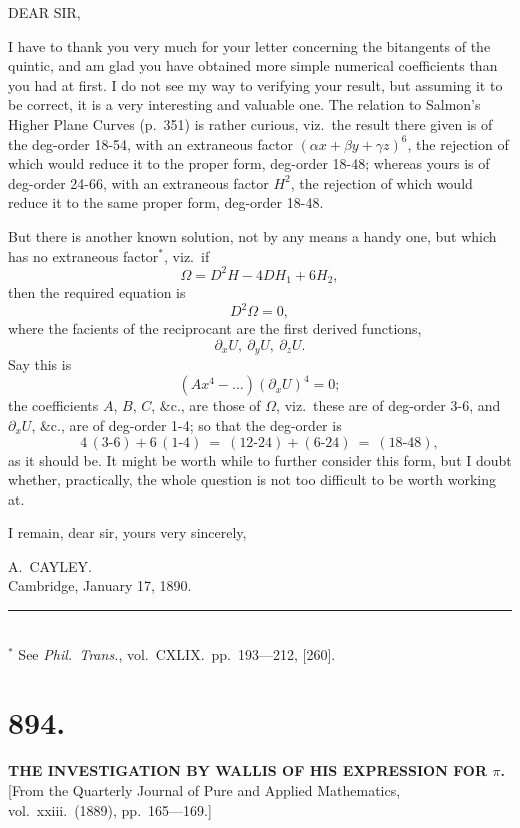 \documentclass[11pt,a4paper]{article}
\begin{document}
DEAR SIR,

I have to thank you very much for your letter concerning the bitangents of the quintic, and am glad you have obtained more simple numerical coefficients than you had at first. I do not see my way to verifying your result, but assuming it to be correct, it is a very interesting and valuable one. The relation to Salmon's Higher Plane Curves (p.\ 351) is rather curious, viz.\ the result there given is of the deg-order 18-54, with an extraneous factor $(\alpha x + \beta y + \gamma z)^6$, the rejection of which would reduce it to the proper form, deg-order 18-48; whereas yours is of deg-order 24-66, with an extraneous factor $H^2$, the rejection of which would reduce it to the same proper form, deg-order 18-48.

But there is another known solution, not by any means a handy one, but which has no extraneous factor$^*$, viz.\ if
\[
\Omega = D^2H - 4DH_1 + 6H_2,
\]
then the required equation is
\[
D^2\Omega = 0,
\]
where the facients of the reciprocant are the first derived functions,
\[
\partial_x U,\ \partial_y U,\ \partial_z U.
\]
Say this is
\[
(Ax^4 - \ldots)(\partial_x U)^4 = 0;
\]
the coefficients $A$, $B$, $C$, \&c., are those of $\Omega$, viz.\ these are of deg-order 3-6, and $\partial_x U$, \&c., are of deg-order 1-4; so that the deg-order is
\[
4\,(3\text{-}6) + 6\,(1\text{-}4)\ =\ (12\text{-}24) + (6\text{-}24)\ =\ (18\text{-}48),
\]
as it should be. It might be worth while to further consider this form, but I doubt whether, practically, the whole question is not too difficult to be worth working at.

I remain, dear sir, yours very sincerely,

\begin{flushright}
A.\ CAYLEY.\\
Cambridge, January 17, 1890.
\end{flushright}

\vspace{0.5em}
\noindent\rule{2in}{0.4pt}\\
$^*$ See \emph{Phil.\ Trans.}, vol.\ CXLIX.\ pp.\ 193---212, [260].


\section*{894.}
\begin{center}
{\large\bfseries THE INVESTIGATION BY WALLIS OF HIS EXPRESSION FOR $\pi$.}\\[0.5em]
\small [From the Quarterly Journal of Pure and Applied Mathematics, vol.\ xxiii.\ (1889), pp.\ 165---169.]
\end{center}
\end{document}
